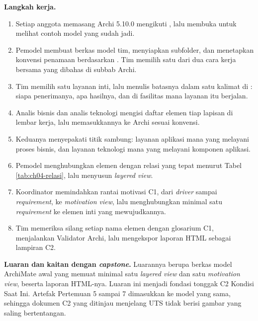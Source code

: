 \textbf{Langkah kerja.}

\begin{enumerate}
  \item Setiap anggota memasang Archi 5.10.0 mengikuti
        , lalu membuka
         untuk
        melihat contoh model yang sudah jadi.
  \item Pemodel membuat berkas model tim, menyiapkan subfolder, dan
        menetapkan konvensi penamaan berdasarkan
        . Tim memilih
        satu dari dua cara kerja bersama yang dibahas di subbab Archi.
  \item Tim memilih satu layanan inti, lalu menulis batasnya dalam satu
        kalimat di :
        siapa penerimanya, apa hasilnya, dan di fasilitas mana layanan itu
        berjalan.
  \item Analis bisnis dan analis teknologi mengisi daftar elemen tiap lapisan
        di lembar kerja, lalu memasukkannya ke Archi sesuai konvensi.
  \item Keduanya menyepakati titik sambung: layanan aplikasi mana yang
        melayani proses bisnis, dan layanan teknologi mana yang melayani
        komponen aplikasi.
  \item Pemodel menghubungkan elemen dengan relasi yang tepat menurut Tabel
        \ref{tab:ch04-relasi}, lalu menyusun \textit{layered view}.
  \item Koordinator memindahkan rantai motivasi C1, dari \textit{driver}
        sampai \textit{requirement}, ke \textit{motivation view}, lalu
        menghubungkan minimal satu \textit{requirement} ke elemen inti yang
        mewujudkannya.
  \item Tim memeriksa silang setiap nama elemen dengan glosarium C1,
        menjalankan Validator Archi, lalu mengekspor laporan HTML sebagai
        lampiran C2.
\end{enumerate}

\textbf{Luaran dan kaitan dengan \textit{capstone}.} Luarannya berupa berkas
model ArchiMate awal yang memuat minimal satu \textit{layered view} dan satu
\textit{motivation view}, beserta laporan HTML-nya. Luaran ini menjadi
fondasi tonggak C2 Kondisi Saat Ini. Artefak Pertemuan 5 sampai 7 dimasukkan
ke model yang sama, sehingga dokumen C2 yang ditinjau menjelang UTS tidak
berisi gambar yang saling bertentangan.

